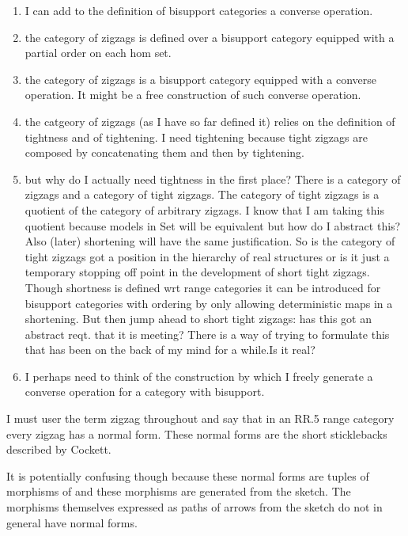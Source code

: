 \documentclass[10pt,a4paper]{article}
\theoremstyle{remark}
\begin{document}
\begin{aside}
\begin{enumerate}
\item 
I can add to the definition of bisupport categories a converse operation.
\item the category of zigzags is defined over a bisupport category equipped with a partial order on each hom set.
\item the category of zigzags  is a bisupport category equipped with a converse operation. It might be a free construction of such converse operation.
\item the catgeory of zigzags (as I have so far defined it) relies on the definition of tightness and of tightening. I need tightening because tight zigzags are composed by concatenating them and then by tightening.
\item but why do I actually need tightness in the first place? There is a category of zigzags and a category of tight zigzags. The category of tight zigzags is a quotient of the category of arbitrary zigzags. I know that I am taking this quotient because models in Set will be equivalent but how do I abstract this? Also (later) shortening will have the same 
justification. So is the category of tight zigzags got a position in the hierarchy of real structures or is it just a temporary stopping off point in the development of short tight zigzags. Though shortness is defined wrt range categories it can be introduced for bisupport categories with ordering by only allowing deterministic maps in a shortening. But then jump ahead to short tight zigzags: has this got an abstract reqt. that it is meeting? There is a way of trying to formulate this that has been on the back of my mind for a while.Is it real? 
\item I perhaps need to think of the construction by which I freely generate a converse operation for a category with bisupport.
\end{enumerate}
\end{aside}



\newcommand{\Fquotient}{F/\!\!\sim}  %

\newcommand{\IfSforCwithRCwords}{If $S$ is a sketch for category \catcw and if $S$ is considered as a data specification with requirement $\reqtc$\ }



\tableofcontents

\begin{aside}
I must user the term zigzag throughout and say that in an RR.5 range category every zigzag has a normal form. These normal forms are the 
short sticklebacks described by Cockett. 

It is potentially confusing though because these normal forms are tuples of morphisms 
of \catcw and these morphisms are generated from the sketch. The morphisms themselves expressed as paths of arrows from the sketch do not in general have normal forms.

\end{aside}
\end{document}
